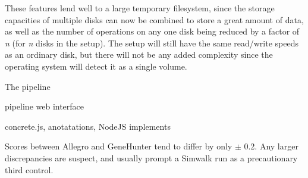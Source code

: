 These features lend well to a large temporary filesystem, since the storage capacities of multiple disks can now be combined to store a great amount of data, as well as the number of operations on any one disk being reduced by a factor of \textit{n} (for \textit{n} disks in the setup). The setup will still have the same read/write speeds as an ordinary disk, but there will not be any added complexity since the operating system will detect it as a single volume.


The pipeline

pipeline web interface

concrete.js, anotatations, NodeJS implements





Scores between Allegro and GeneHunter tend to differ by only $\pm$ 0.2. Any larger discrepancies are suspect, and usually prompt a Simwalk run as a precautionary third control.
